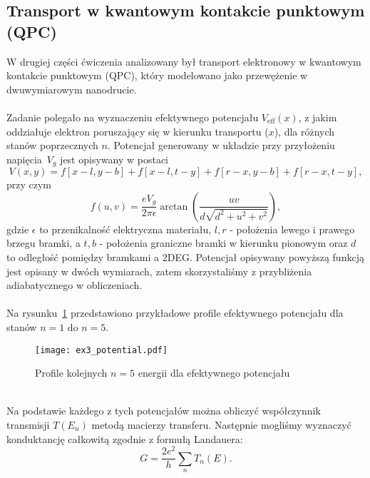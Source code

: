 \documentclass{article}
\begin{document}
\subsection{Transport w kwantowym kontakcie punktowym (QPC)} 
W drugiej części ćwiczenia analizowany był transport elektronowy w kwantowym kontakcie punktowym (QPC), który modelowano jako przewężenie w dwuwymiarowym nanodrucie.\\
\\
Zadanie polegało na wyznaczeniu efektywnego potencjału $V_{\text{eff}}(x)$, z jakim oddziałuje elektron poruszający się w kierunku transportu ($x$), dla różnych stanów poprzecznych $n$. 
Potencjał generowany w układzie przy przyłożeniu napięcia~$V_g$ jest opisywany w postaci
\begin{equation}
    V(x, y) = f\left[x-l, y-b\right]
    +f\left[x-l, t-y\right]
    +f\left[r-x, y-b\right]
    +f\left[r-x, t-y\right],
\end{equation}
przy czym
\begin{equation}
    f(u,v) = \frac{eV_g}{2\pi \epsilon}\arctan \left(\frac{uv}{d\sqrt{d^2+u^2+v^2}}\right),
\end{equation}
gdzie $\epsilon$ to przenikalność elektryczna materiału, $l,r$ - położenia lewego i prawego brzegu bramki, a $t,b$ - położenia graniczne bramki w kierunku pionowym oraz $d$ to odległość pomiędzy bramkami a 2DEG.
Potencjał opisywany powyższą funkcją jest opisany w dwóch wymiarach, zatem skorzystaliśmy z przybliżenia adiabatycznego w obliczeniach.\\
\\
Na rysunku~\ref{fig:ex3-eff-pot} przedstawiono przykładowe profile efektywnego potencjału dla stanów $n=1$ do $n=5$.\\
\begin{figure}[htp!]
    \centering
    \texttt{[image: ex3\_potential.pdf]}
    \caption{Profile kolejnych $n=5$ energii dla efektywnego potencjału }
    \label{fig:ex3-eff-pot}
\end{figure}
\\
Na podstawie każdego z tych potencjałów można obliczyć współczynnik transmisji $T(E_n)$ metodą macierzy transferu.
Następnie mogliśmy wyznaczyć konduktancję całkowitą zgodnie z formułą Landauera: 
\begin{equation} 
G = \frac{2e^2}{h} \sum_n T_n(E).
\end{equation} 
\end{document}
